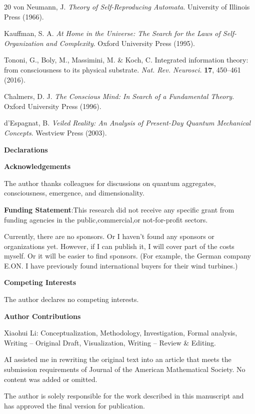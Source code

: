 \documentclass[11pt,a4paper]{article}
\begin{document}
\begin{thebibliography}{20}
von Neumann, J. \textit{Theory of Self-Reproducing Automata}. University of Illinois Press (1966).

Kauffman, S. A. \textit{At Home in the Universe: The Search for the Laws of Self-Organization and Complexity}. Oxford University Press (1995).

Tononi, G., Boly, M., Massimini, M. \& Koch, C. Integrated information theory: from consciousness to its physical substrate. \textit{Nat. Rev. Neurosci.} \textbf{17}, 450--461 (2016).

Chalmers, D. J. \textit{The Conscious Mind: In Search of a Fundamental Theory}. Oxford University Press (1996).

d'Espagnat, B. \textit{Veiled Reality: An Analysis of Present-Day Quantum Mechanical Concepts}. Westview Press (2003).

\textbf{\textbf{Declarations}}

  
  
  \textbf{\textbf{Acknowledgements}}

The author thanks colleagues for discussions on quantum aggregates, consciousness, emergence, and dimensionality. 

 \textbf{\textbf{Funding Statement}}:This research did not receive any specific grant from funding agencies in the public,commercial,or not-for-profit sectors.

Currently, there are no sponsors. Or I haven't found any sponsors or organizations yet. However, if I can publish it, I will cover part of the costs myself. Or it will be easier to find sponsors. (For example, the German company E.ON. I have previously found international buyers for their wind turbines.)

 \textbf{\textbf{Competing Interests}}

The author declares no competing interests.

 \textbf{\textbf{Author Contributions}}

Xiaohui Li: Conceptualization, Methodology, Investigation, Formal analysis, Writing – Original Draft, Visualization, Writing – Review \& Editing.

AI assisted me in rewriting the original text into an article that meets the submission requirements of Journal of the American Mathematical Society. No content was added or omitted.

 The author is solely responsible for the work described in this manuscript and has approved the final version for publication.


\end{thebibliography}
\end{document}
